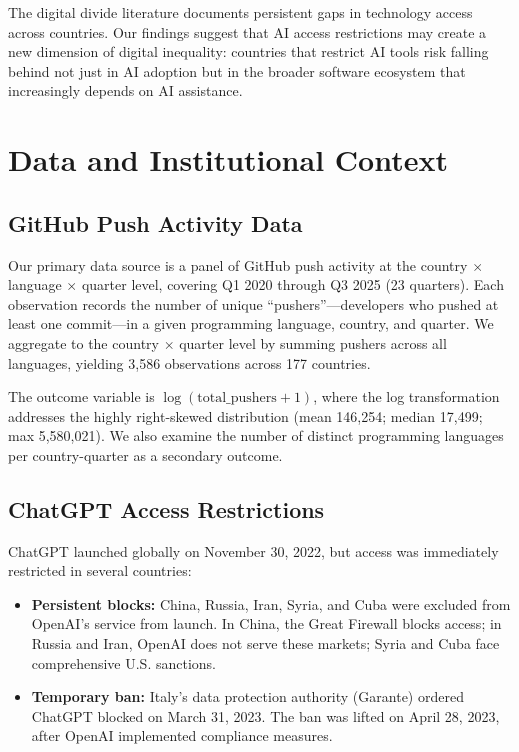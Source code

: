 \documentclass[12pt]{article}
\begin{document}
The digital divide literature documents persistent gaps in technology access across countries. Our findings suggest that AI access restrictions may create a new dimension of digital inequality: countries that restrict AI tools risk falling behind not just in AI adoption but in the broader software ecosystem that increasingly depends on AI assistance.

\section{Data and Institutional Context}

\subsection{GitHub Push Activity Data}

Our primary data source is a panel of GitHub push activity at the country $\times$ language $\times$ quarter level, covering Q1 2020 through Q3 2025 (23 quarters). Each observation records the number of unique ``pushers''---developers who pushed at least one commit---in a given programming language, country, and quarter. We aggregate to the country $\times$ quarter level by summing pushers across all languages, yielding 3,586 observations across 177 countries.

The outcome variable is $\log(\text{total\_pushers} + 1)$, where the log transformation addresses the highly right-skewed distribution (mean 146,254; median 17,499; max 5,580,021). We also examine the number of distinct programming languages per country-quarter as a secondary outcome.

\subsection{ChatGPT Access Restrictions}

ChatGPT launched globally on November 30, 2022, but access was immediately restricted in several countries:

\begin{itemize}
    \item \textbf{Persistent blocks:} China, Russia, Iran, Syria, and Cuba were excluded from OpenAI's service from launch. In China, the Great Firewall blocks access; in Russia and Iran, OpenAI does not serve these markets; Syria and Cuba face comprehensive U.S. sanctions.
    \item \textbf{Temporary ban:} Italy's data protection authority (Garante) ordered ChatGPT blocked on March 31, 2023. The ban was lifted on April 28, 2023, after OpenAI implemented compliance measures.
\end{itemize}
\end{document}
